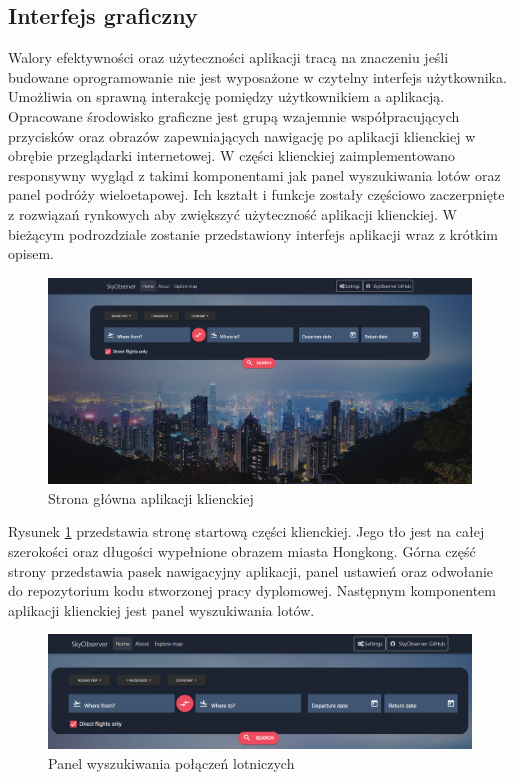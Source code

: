 \documentclass[12pt, twoside]{report}
\begin{document}
\subsection{Interfejs graficzny}
Walory efektywności oraz użyteczności aplikacji tracą na znaczeniu jeśli budowane oprogramowanie nie jest wyposażone w czytelny interfejs użytkownika. Umożliwia on sprawną interakcję pomiędzy użytkownikiem a aplikacją.  Opracowane środowisko graficzne jest grupą wzajemnie współpracujących przycisków oraz obrazów zapewniających nawigację po aplikacji klienckiej w obrębie przeglądarki internetowej. 
W części klienckiej zaimplementowano responsywny wygląd z takimi komponentami jak panel wyszukiwania lotów oraz panel podróży wieloetapowej. Ich kształt i funkcje zostały częściowo zaczerpnięte z rozwiązań rynkowych aby zwiększyć użyteczność aplikacji klienckiej. 
W bieżącym podrozdziale zostanie przedstawiony interfejs aplikacji wraz z krótkim opisem.
\begin{figure}[!ht]
\centering
\includegraphics[scale=0.32, keepaspectratio]{client_main_page.png}
\caption{Strona główna aplikacji klienckiej}
\label{fig:client_main_page}
\end{figure}
Rysunek \ref{fig:client_main_page} przedstawia stronę startową części klienckiej. Jego tło jest na całej szerokości oraz długości wypełnione obrazem miasta Hongkong. Górna część strony przedstawia pasek nawigacyjny aplikacji, panel ustawień oraz odwołanie do repozytorium kodu stworzonej pracy dyplomowej. Następnym komponentem aplikacji klienckiej jest panel wyszukiwania lotów.
\begin{figure}[!ht]
\centering
\includegraphics[scale=0.39, keepaspectratio]{search_panel.png}
\caption{Panel wyszukiwania połączeń lotniczych}
\label{fig:search_panel}
\end{figure}
\end{document}
